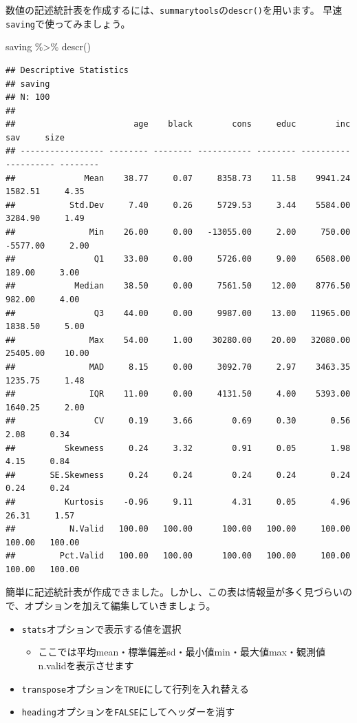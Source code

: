 \documentclass[
]{book}
\newenvironment{Shaded}{\begin{snugshade}}{\end{snugshade}}
\newcommand{\FunctionTok}[1]{\textcolor[rgb]{0.00,0.00,0.00}{#1}}
\newcommand{\NormalTok}[1]{#1}
\newcommand{\SpecialCharTok}[1]{\textcolor[rgb]{0.00,0.00,0.00}{#1}}
\providecommand{\tightlist}{%
  \setlength{\itemsep}{0pt}\setlength{\parskip}{0pt}}
\begin{document}
数値の記述統計表を作成するには、\texttt{summarytools}の\texttt{descr()}を用います。
早速\texttt{saving}で使ってみましょう。

\begin{Shaded}
\begin{Highlighting}[]
\NormalTok{saving }\SpecialCharTok{\%\textgreater{}\%} 
  \FunctionTok{descr}\NormalTok{()}
\end{Highlighting}
\end{Shaded}

\begin{verbatim}
## Descriptive Statistics  
## saving  
## N: 100  
## 
##                        age    black        cons     educ        inc        sav     size
## ----------------- -------- -------- ----------- -------- ---------- ---------- --------
##              Mean    38.77     0.07     8358.73    11.58    9941.24    1582.51     4.35
##           Std.Dev     7.40     0.26     5729.53     3.44    5584.00    3284.90     1.49
##               Min    26.00     0.00   -13055.00     2.00     750.00   -5577.00     2.00
##                Q1    33.00     0.00     5726.00     9.00    6508.00     189.00     3.00
##            Median    38.50     0.00     7561.50    12.00    8776.50     982.00     4.00
##                Q3    44.00     0.00     9987.00    13.00   11965.00    1838.50     5.00
##               Max    54.00     1.00    30280.00    20.00   32080.00   25405.00    10.00
##               MAD     8.15     0.00     3092.70     2.97    3463.35    1235.75     1.48
##               IQR    11.00     0.00     4131.50     4.00    5393.00    1640.25     2.00
##                CV     0.19     3.66        0.69     0.30       0.56       2.08     0.34
##          Skewness     0.24     3.32        0.91     0.05       1.98       4.15     0.84
##       SE.Skewness     0.24     0.24        0.24     0.24       0.24       0.24     0.24
##          Kurtosis    -0.96     9.11        4.31     0.05       4.96      26.31     1.57
##           N.Valid   100.00   100.00      100.00   100.00     100.00     100.00   100.00
##         Pct.Valid   100.00   100.00      100.00   100.00     100.00     100.00   100.00
\end{verbatim}

簡単に記述統計表が作成できました。しかし、この表は情報量が多く見づらいので、オプションを加えて編集していきましょう。

\begin{itemize}
\tightlist
\item
  \texttt{stats}オプションで表示する値を選択

  \begin{itemize}
  \tightlist
  \item
    ここでは平均mean・標準偏差sd・最小値min・最大値max・観測値n.validを表示させます
  \end{itemize}
\item
  \texttt{transpose}オプションを\texttt{TRUE}にして行列を入れ替える
\item
  \texttt{heading}オプションを\texttt{FALSE}にしてヘッダーを消す
\end{itemize}
\end{document}
